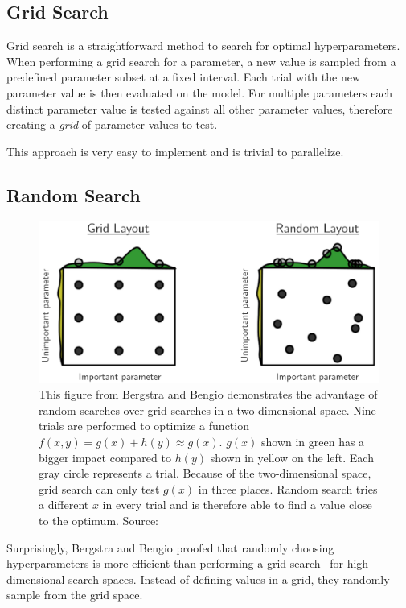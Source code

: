 \subsection{Grid Search}

Grid search is a straightforward method to search for optimal hyperparameters. When performing a grid search for a parameter, a new value is sampled from a predefined parameter subset at a fixed interval. Each trial with the new parameter value is then evaluated on the model. For multiple parameters each distinct parameter value is tested against all other parameter values, therefore creating a \textit{grid} of parameter values to test.

This approach is very easy to implement and is trivial to parallelize.

\subsection{Random Search}

\begin{figure}[ht]
    \centering
    \includegraphics[scale=0.35]{figures/03_theory/03_randomSearch}
    \caption{This figure from Bergstra and Bengio demonstrates the advantage of random searches over grid searches in a two-dimensional space. Nine trials are performed to optimize a function $f(x, y) = g(x) + h(y) \approx g(x)$. $g(x)$ shown in green has a bigger impact compared to $h(y)$ shown in yellow on the left. Each gray circle represents a trial. Because of the two-dimensional space, grid search can only test $g(x)$ in three places. Random search tries a different $x$ in every trial and is therefore able to find a value close to the optimum. Source:~\cite{Bergstra2012a}}
    \label{fig:03_randomSearch}
\end{figure}

Surprisingly, Bergstra and Bengio proofed that randomly choosing hyperparameters is more efficient than performing a grid search~\cite{Bergstra2012a} for high dimensional search spaces. Instead of defining values in a grid, they randomly sample from the grid space.

